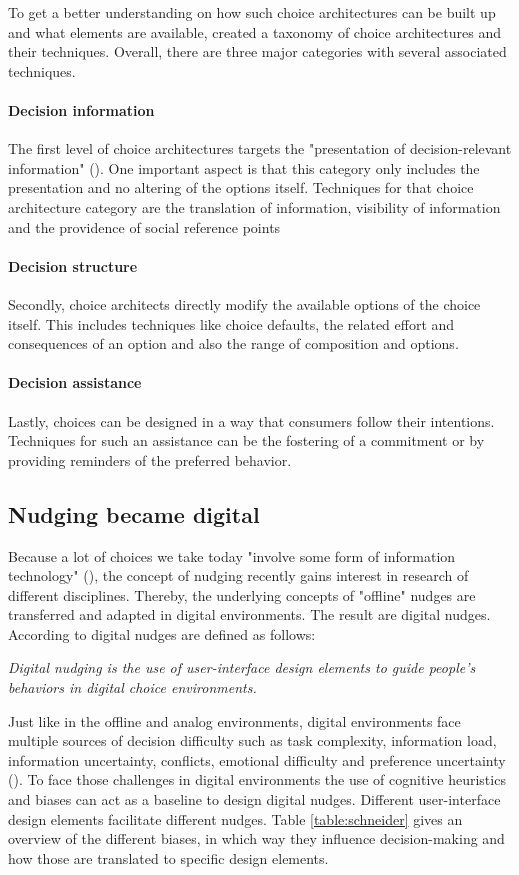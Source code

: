 To get a better understanding on how such choice architectures can be built up and what elements are available,  \cite{munscher_review_2016} created a taxonomy of choice architectures and their techniques. Overall, there are three major categories with several associated techniques. 
\paragraph{Decision information}
The first level of choice architectures targets the "presentation of decision-relevant information" (\cite{munscher_review_2016}). One important aspect is that this category only includes the presentation and no altering of the options itself. Techniques for that choice architecture category are the translation of information, visibility of information and the providence of social reference points
\paragraph{Decision structure}
Secondly, choice architects directly modify the available options of the choice itself. This includes techniques like choice defaults, the related effort and consequences of an option and also the range of composition and options.
\paragraph{Decision assistance}
Lastly, choices can be designed in a way that consumers follow their intentions. Techniques for such an assistance can be the fostering of a commitment or by providing reminders of the preferred behavior.

\subsection{Nudging became digital}
Because a lot of choices we take today "involve some form of information technology" (\cite{johnson_beyond_2012}), the concept of nudging recently gains interest in research of different disciplines. Thereby, the underlying concepts of "offline" nudges are transferred and adapted in digital environments. The result are digital nudges. According to \cite{weinmann_digital_2016} digital nudges are defined as follows:
\begin{center}
\textit{Digital nudging is the use of user-interface design elements to guide people's behaviors in digital choice environments.}
\end{center}
Just like in the offline and analog environments, digital environments face multiple sources of decision difficulty such as task complexity, information load, information uncertainty, conflicts, emotional difficulty and preference uncertainty (\cite{broniarczyk_decision_2014}). To face those challenges in digital environments the use of cognitive heuristics and biases can act as a baseline to design digital nudges. Different user-interface design elements facilitate different nudges. Table \ref{table:schneider} gives an overview of the different biases, in which way they influence decision-making and how those are translated to specific design elements.

